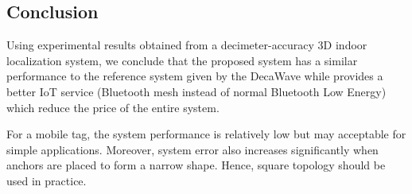 \documentclass[\main/main.tex]{subfiles}
\begin{document}
\subsection{Conclusion}
Using experimental results obtained from a decimeter-accuracy 3D indoor localization system, we conclude that the proposed system has a similar performance to the reference system given by the DecaWave while provides a better IoT service (Bluetooth mesh instead of normal Bluetooth Low Energy) which reduce the price of the entire system.

For a mobile tag, the system performance is relatively low but may acceptable for simple applications. Moreover, system error also increases significantly when anchors are placed to form a narrow shape. Hence, square topology should be used in practice.
\end{document}

